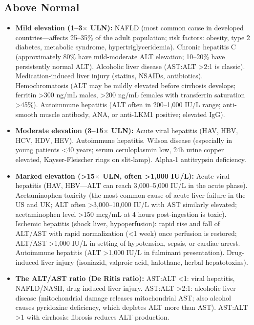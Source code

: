 \subsection*{Above Normal}
\begin{itemize}
  \item \textbf{Mild elevation (1--3$\times$ ULN):} NAFLD (most common cause in developed countries---affects 25--35\% of the adult population; risk factors: obesity, type 2 diabetes, metabolic syndrome, hypertriglyceridemia). Chronic hepatitis C (approximately 80\% have mild-moderate ALT elevation; 10--20\% have persistently normal ALT). Alcoholic liver disease (AST:ALT >2:1 is classic). Medication-induced liver injury (statins, NSAIDs, antibiotics). Hemochromatosis (ALT may be mildly elevated before cirrhosis develops; ferritin >300 ng/mL males, >200 ng/mL females with transferrin saturation >45\%). Autoimmune hepatitis (ALT often in 200--1,000 IU/L range; anti-smooth muscle antibody, ANA, or anti-LKM1 positive; elevated IgG).
  \item \textbf{Moderate elevation (3--15$\times$ ULN):} Acute viral hepatitis (HAV, HBV, HCV, HDV, HEV). Autoimmune hepatitis. Wilson disease (especially in young patients <40 years; serum ceruloplasmin low, 24h urine copper elevated, Kayser-Fleischer rings on slit-lamp). Alpha-1 antitrypsin deficiency.
  \item \textbf{Marked elevation (>15$\times$ ULN, often >1,000 IU/L):} Acute viral hepatitis (HAV, HBV---ALT can reach 3,000--5,000 IU/L in the acute phase). Acetaminophen toxicity (the most common cause of acute liver failure in the US and UK; ALT often >3,000--10,000 IU/L with AST similarly elevated; acetaminophen level >150 mcg/mL at 4 hours post-ingestion is toxic). Ischemic hepatitis (shock liver, hypoperfusion): rapid rise and fall of ALT/AST with rapid normalization (<1 week) once perfusion is restored; ALT/AST >1,000 IU/L in setting of hypotension, sepsis, or cardiac arrest. Autoimmune hepatitis (ALT >1,000 IU/L in fulminant presentation). Drug-induced liver injury (isoniazid, valproic acid, halothane, herbal hepatotoxins).
  \item \textbf{The ALT/AST ratio (De Ritis ratio):} AST:ALT <1: viral hepatitis, NAFLD/NASH, drug-induced liver injury. AST:ALT >2:1: alcoholic liver disease (mitochondrial damage releases mitochondrial AST; also alcohol causes pyridoxine deficiency, which depletes ALT more than AST). AST:ALT >1 with cirrhosis: fibrosis reduces ALT production.
\end{itemize}

